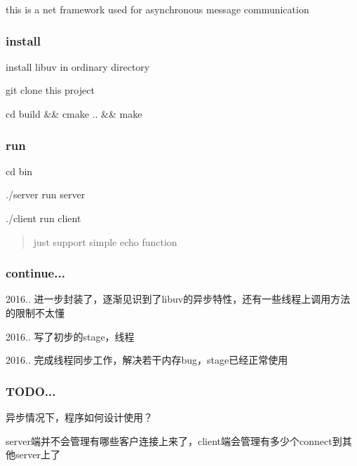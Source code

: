 this is a net framework used for asynchronous message communication

\subsubsection*{install}


\begin{DoxyEnumerate}
\item install libuv in ordinary directory
\item git clone this project
\item cd build \&\& cmake .. \&\& make
\end{DoxyEnumerate}

\subsubsection*{run}


\begin{DoxyItemize}
\item cd bin
\item ./server run server
\item ./client run client
\end{DoxyItemize}

\begin{quote}
just support simple echo function \end{quote}


\subsubsection*{continue...}


\begin{DoxyItemize}
\item 2016.. 进一步封装了，逐渐见识到了libuv的异步特性，还有一些线程上调用方法的限制不太懂
\item 2016.. 写了初步的stage，线程
\item 2016.. 完成线程同步工作，解决若干内存bug，stage已经正常使用
\end{DoxyItemize}

\subsubsection*{T\+O\+DO...}


\begin{DoxyItemize}
\item 异步情况下，程序如何设计使用？
\item server端并不会管理有哪些客户连接上来了，client端会管理有多少个connect到其他server上了
\end{DoxyItemize}

